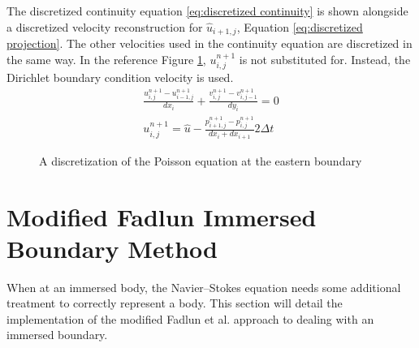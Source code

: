 The discretized continuity equation \eqref{eq:discretized continuity} is shown alongside a discretized velocity reconstruction for $\hat{u}_{i+1,j}$, Equation \eqref{eq:discretized projection}. 
The other velocities used in the continuity equation are discretized in the same way. 
In the reference Figure \ref{fig:ID poisson}, $u_{i,j}^{n+1}$ is not substituted for.
Instead, the Dirichlet boundary condition velocity is used.
\begin{align}
\frac{u_{i,j}^{n+1} - u_{i-1,j}^{n+1}}{dx_i} + \frac{v_{i,j}^{n+1} - v_{i,j-1}^{n+1}}{dy_i} = 0 \label{eq:discretized continuity} \\
u_{i,j}^{n+1} = \hat{u} - \frac{p_{i+1,j}^{n+1} - p_{i,j}^{n+1}}{dx_i + dx_{i+1}}2\Delta t \; \label{eq:discretized projection}
\end{align}
\begin{figure}
	\centering
	
	\caption{A discretization of the Poisson equation at the eastern boundary}
	\label{fig:ID poisson}
\end{figure}

\section{Modified Fadlun Immersed Boundary Method}
\label{sec:ID fadlun}
\label{sec:modified fadlun}
When at an immersed body, the Navier--Stokes equation needs some additional treatment to correctly represent a body. 
This section will detail the implementation of the modified Fadlun et al\cite{Fadlun:2000fl}. approach to dealing with an immersed boundary.

